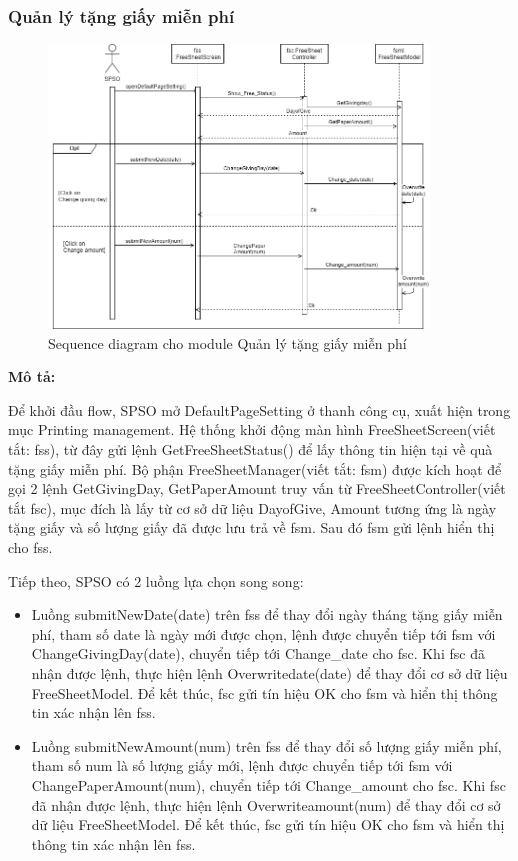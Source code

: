 \subsubsection{Quản lý tặng giấy miễn phí}

\begin{figure}[H]
    \begin{center}
        \includegraphics[width=0.9\textwidth]{Images/System Modelling/FreeSheetSetting_Sequence.png}
        \caption{Sequence diagram cho module Quản lý tặng giấy miễn phí}
        \label{fig:arch}
    \end{center}
\end{figure}
\textbf{Mô tả:}\par
Để khởi đầu flow, SPSO mở DefaultPageSetting ở thanh công cụ, xuất hiện trong mục Printing management. Hệ thống khởi động màn hình FreeSheetScreen(viết tắt: fss), từ đây gửi lệnh GetFreeSheetStatus() để lấy thông tin hiện tại về quà tặng giấy miễn phí. Bộ phận FreeSheetManager(viết tắt: fsm) được kích hoạt để gọi 2 lệnh GetGivingDay, GetPaperAmount truy vấn từ FreeSheetController(viết tắt fsc), mục đích là lấy từ cơ sở dữ liệu DayofGive, Amount tương ứng là ngày tặng giấy và số lượng giấy đã được lưu trả về fsm. Sau đó fsm gửi lệnh hiển thị cho fss.  \par
Tiếp theo, SPSO có 2 luồng lựa chọn song song:
\begin{itemize}
    \item Luồng submitNewDate(date) trên fss để thay đổi ngày tháng tặng giấy miễn phí, tham số date là ngày mới được chọn, lệnh được chuyển tiếp tới fsm với ChangeGivingDay(date), chuyển tiếp tới Change\_date cho fsc. Khi fsc đã nhận được lệnh, thực hiện lệnh Overwritedate(date) để thay đổi cơ sở dữ liệu FreeSheetModel. Để kết thúc, fsc gửi tín hiệu OK cho fsm và hiển thị thông tin xác nhận lên fss.
    \item Luồng submitNewAmount(num) trên fss để thay đổi số lượng giấy miễn phí, tham số num là số lượng giấy mới, lệnh được chuyển tiếp tới fsm với ChangePaperAmount(num), chuyển tiếp tới Change\_amount cho fsc. Khi fsc đã nhận được lệnh, thực hiện lệnh Overwriteamount(num) để thay đổi cơ sở dữ liệu FreeSheetModel. Để kết thúc, fsc gửi tín hiệu OK cho fsm và hiển thị thông tin xác nhận lên fss.
\end{itemize}

